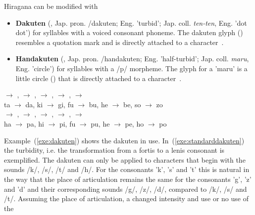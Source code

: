 Hiragana can be modified with
\begin{itemize}

  \item \textbf{Dakuten} (, Jap. pron. /dakuten;
        Eng. 'turbid'; Jap. coll. \emph{ten-ten}, Eng. 'dot dot') for 
        syllables with a voiced consonant phoneme. The dakuten glyph ()  
        resembles a quotation mark and is directly attached to a 
        character~.

  \item \textbf{Handakuten} (,
        Jap. pron. /handakuten; 
        Eng. 'half-turbid'; Jap. coll. \emph{maru}, Eng. 'circle') for syllables 
        with a /p/ morpheme. The glyph for a 'maru' is a little circle ()
        that is directly attached to a character~.

\end{itemize}
\begin{exe}
\ex \label{exe:dakuten}
\begin{xlist}
\ex \label{exe:standarddakuten}
\gll {} $\rightarrow$ ,  $\rightarrow$ ,  $\rightarrow$ ,  $\rightarrow$ ,  $\rightarrow$  \\
ta $\rightarrow$ da, ki $\rightarrow$ gi, fu $\rightarrow$ bu, he $\rightarrow$ be, so $\rightarrow$ zo \\

\ex \label{exe:handakuten}
\gll {} $\rightarrow$ ,  $\rightarrow$ ,  $\rightarrow$ ,  $\rightarrow$ ,  $\rightarrow$  \\
ha $\rightarrow$ pa, hi $\rightarrow$ pi, fu $\rightarrow$ pu, he $\rightarrow$ pe, ho $\rightarrow$ po \\
\end{xlist}
\end{exe}
Example~(\ref{exe:dakuten}) shows the dakuten in use. 
In~(\ref{exe:standarddakuten}) the turbidity, i.e. the transformation from a 
fortis to a lenis consonant is exemplified. 
The dakuten can only be applied to characters that begin with the sounds 
/k/, /s/, /t/ and /h/. For the consonants 'k', 's' and 't' this is natural in the
way that the place of articulation remains the same for the consonants 'g', 'z' 
and 'd' and their corresponding sounds /g/, /z/, /d/, 
compared to /k/, /s/ and /t/.
Assuming the place of articulation, a changed intensity and use or no use of the 
